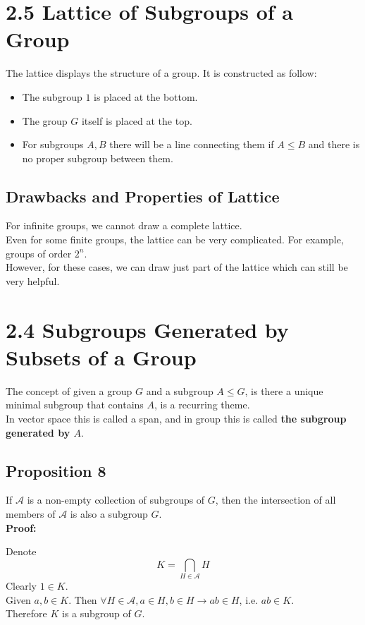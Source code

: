 \documentclass{article}
\begin{document}
\section*{2.5 Lattice of Subgroups of a Group}
The lattice displays the structure of a group. It is constructed as follow:
\begin{itemize}
    \item The subgroup $1$ is placed at the bottom.
    \item The group $G$ itself is placed at the top.
    \item For subgroups $A, B$ there will be a line connecting them if $A \le B$ and there is no proper subgroup between them.
\end{itemize}
\subsection*{Drawbacks and Properties of Lattice}
For infinite groups, we cannot draw a complete lattice.\\
Even for some finite groups, the lattice can be very complicated. For example, groups of order $2^n$.\\
However, for these cases, we can draw just part of the lattice which can still be very helpful.
\section*{2.4 Subgroups Generated by Subsets of a Group}
The concept of given a group $G$ and a subgroup $A \leq G$, is there a unique minimal subgroup that contains $A$, is a recurring theme.\\
In vector space this is called a span, and in group this is called \textbf{the subgroup generated by $A$}.
\subsection*{Proposition 8}
If $\mathcal{A}$ is a non-empty collection of subgroups of $G$, then the intersection of all members of $\mathcal{A}$ is also a subgroup $G$.\\
\textbf{Proof:}
\begin{addmargin}[1em]{0em}
    Denote
    \begin{equation*}
        K = \bigcap_{H \in \mathcal{A}} H
    \end{equation*}
    Clearly $1 \in K$.\\
    Given $a, b \in K$. Then $\forall H \in \mathcal{A}, a \in H, b \in H \rightarrow ab \in H$, i.e. $ab \in K$.\\
    Therefore $K$ is a subgroup of $G$.
\end{addmargin}
\end{document}

